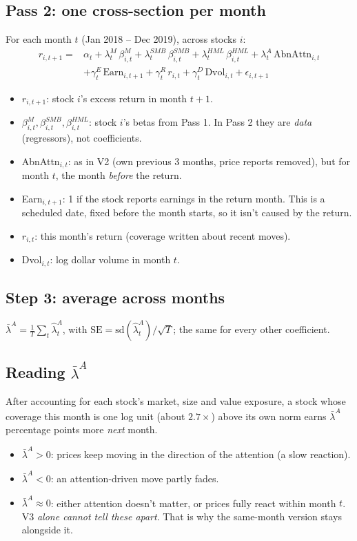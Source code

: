 \documentclass[11pt]{article}
\begin{document}
\subsection*{Pass 2: one cross-section per month}
For each month $t$ (Jan 2018 -- Dec 2019), across stocks $i$:
\begin{align*}
r_{i,t+1} = {}& \alpha_t + \lambda^{M}_t\,\beta^{M}_{i,t} + \lambda^{SMB}_t\,\beta^{SMB}_{i,t} + \lambda^{HML}_t\,\beta^{HML}_{i,t} + \lambda^{A}_t\,\text{AbnAttn}_{i,t}\\
&+ \gamma^{E}_t\,\text{Earn}_{i,t+1} + \gamma^{R}_t\,r_{i,t} + \gamma^{D}_t\,\text{Dvol}_{i,t} + \epsilon_{i,t+1}
\end{align*}
\begin{itemize}
  \item $r_{i,t+1}$: stock $i$'s excess return in month $t+1$.
  \item $\beta^{M}_{i,t},\beta^{SMB}_{i,t},\beta^{HML}_{i,t}$: stock $i$'s betas from Pass 1. In Pass 2 they are \emph{data} (regressors), not coefficients.
  \item AbnAttn$_{i,t}$: as in V2 (own previous 3 months, price reports removed), but for month $t$, the month \emph{before} the return.
  \item Earn$_{i,t+1}$: 1 if the stock reports earnings in the return month. This is a scheduled date, fixed before the month starts, so it isn't caused by the return.
  \item $r_{i,t}$: this month's return (coverage written about recent moves).
  \item Dvol$_{i,t}$: log dollar volume in month $t$.
\end{itemize}

\subsection*{Step 3: average across months}
$\bar\lambda^{A} = \frac{1}{T}\sum_t \hat\lambda^{A}_t$, with $\text{SE} = \text{sd}(\hat\lambda^{A}_t)/\sqrt{T}$; the same for every other coefficient.

\subsection*{Reading $\bar\lambda^{A}$}
After accounting for each stock's market, size and value exposure, a stock whose coverage this month is one log unit (about $2.7\times$) above its own norm earns $\bar\lambda^{A}$ percentage points more \emph{next} month.
\begin{itemize}
  \item $\bar\lambda^{A} > 0$: prices keep moving in the direction of the attention (a slow reaction).
  \item $\bar\lambda^{A} < 0$: an attention-driven move partly fades.
  \item $\bar\lambda^{A} \approx 0$: either attention doesn't matter, or prices fully react within month $t$. V3 \emph{alone cannot tell these apart}. That is why the same-month version stays alongside it.
\end{itemize}
\end{document}
